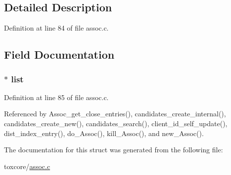 \subsection{Detailed Description}


Definition at line 84 of file assoc.\+c.



\subsection{Field Documentation}
\hypertarget{structcandidates__bucket_a515f2b5e53003e623b334ab90c4280e0}{
\subsubsection[{list}]{$\ast$ list}}\label{structcandidates__bucket_a515f2b5e53003e623b334ab90c4280e0}


Definition at line 85 of file assoc.\+c.



Referenced by Assoc\+\_\+get\+\_\+close\+\_\+entries(), candidates\+\_\+create\+\_\+internal(), candidates\+\_\+create\+\_\+new(), candidates\+\_\+search(), client\+\_\+id\+\_\+self\+\_\+update(), dist\+\_\+index\+\_\+entry(), do\+\_\+\+Assoc(), kill\+\_\+\+Assoc(), and new\+\_\+\+Assoc().



The documentation for this struct was generated from the following file\+:\begin{DoxyCompactItemize}
\item 
toxcore/\hyperlink{assoc_8c}{assoc.\+c}\end{DoxyCompactItemize}
